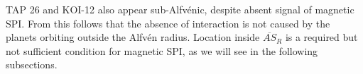 \documentclass[twocolumn]{aastex631}
\begin{document}
TAP 26 and KOI-12 also appear sub-Alfv\'enic, despite absent signal of magnetic SPI. From this follows that the absence of interaction is not caused by the planets orbiting outside the Alfv\'en radius. Location inside $\overline{AS}_{R}$ is a required but not sufficient condition for magnetic SPI, as we will see in the following subsections. %
\end{document}
